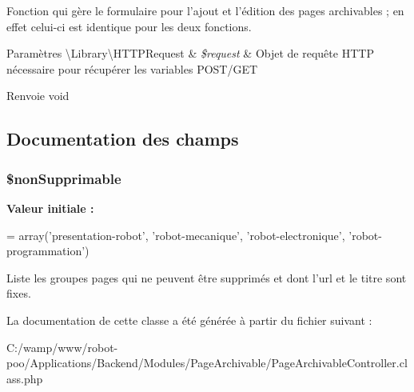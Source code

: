 Fonction qui gère le formulaire pour l'ajout et l'édition des pages archivables ; en effet celui-\/ci est identique pour les deux fonctions.


\begin{DoxyParams}[1]{Paramètres}
\textbackslash{}\+Library\textbackslash{}\+H\+T\+T\+P\+Request & {\em \$request} & Objet de requête H\+T\+T\+P nécessaire pour récupérer les variables P\+O\+S\+T/\+G\+E\+T \\
\hline
\end{DoxyParams}
\begin{DoxyReturn}{Renvoie}
void 
\end{DoxyReturn}


\subsection{Documentation des champs}
\hypertarget{class_applications_1_1_backend_1_1_modules_1_1_page_archivable_1_1_page_archivable_controller_a25c6842b81a175d908c8994c883d5fe1}{
\subsubsection[{\$non\+Supprimable}]{\setlength{\rightskip}{0pt plus 5cm}\$non\+Supprimable\hspace{0.3cm}{\ttfamily [protected]}}}\label{class_applications_1_1_backend_1_1_modules_1_1_page_archivable_1_1_page_archivable_controller_a25c6842b81a175d908c8994c883d5fe1}
{\bfseries Valeur initiale \+:}
\begin{DoxyCode}
= array(\textcolor{stringliteral}{'presentation-robot'},
                                    \textcolor{stringliteral}{'robot-mecanique'}, 
                                    \textcolor{stringliteral}{'robot-electronique'}, 
                                    \textcolor{stringliteral}{'robot-programmation'})
\end{DoxyCode}
Liste les groupes pages qui ne peuvent être supprimés et dont l'url et le titre sont fixes. 

La documentation de cette classe a été générée à partir du fichier suivant \+:\begin{DoxyCompactItemize}
\item 
C\+:/wamp/www/robot-\/poo/\+Applications/\+Backend/\+Modules/\+Page\+Archivable/Page\+Archivable\+Controller.\+class.\+php\end{DoxyCompactItemize}
